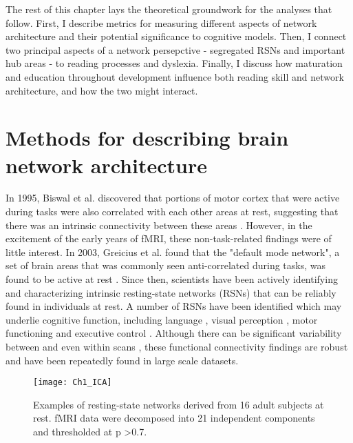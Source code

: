The rest of this chapter lays the theoretical groundwork for the analyses that follow. First, I describe metrics for measuring different aspects of network architecture and their potential significance to cognitive models. Then, I connect two principal aspects of a network persepctive - segregated RSNs and important hub areas - to reading processes and dyslexia. Finally, I discuss how maturation and education throughout development influence both reading skill and network architecture, and how the two might interact. 


\section{Methods for describing brain network architecture}

In 1995, Biswal et al. discovered that portions of motor cortex that were active during tasks were also correlated with each other areas at rest, suggesting that there was an intrinsic connectivity between these areas \cite{Biswal1995}. However, in the excitement of the early years of fMRI, these non-task-related findings were of little interest. In 2003, Greicius et al. found that the "default mode network", a set of brain areas that was commonly seen anti-correlated during tasks, was found to be active at rest \cite{Greicius2003}. Since then, scientists have been actively identifying and characterizing intrinsic resting-state networks (RSNs) that can be reliably found in individuals at rest. A number of RSNs have been identified which may underlie cognitive function, including language \cite{Cordes2000, Hampson2002}, visual perception \cite{Cordes2000, Simmons2012}, motor functioning \cite{Biswal1995} and executive control \cite{Seeley2007, Simmons2012}. Although there can be significant variability between and even within scans \cite{Honey2009}, these functional connectivity findings are robust and have been repeatedly found in large scale datasets.

\begin{figure}[t]
    \centering
    \texttt{[image: Ch1\_ICA]}
    \caption[Examples of resting-state networks.]{Examples of resting-state networks derived from 16 adult subjects at rest. fMRI data were decomposed into 21 independent components and thresholded at p \textgreater 0.7.} 
\end{figure}

